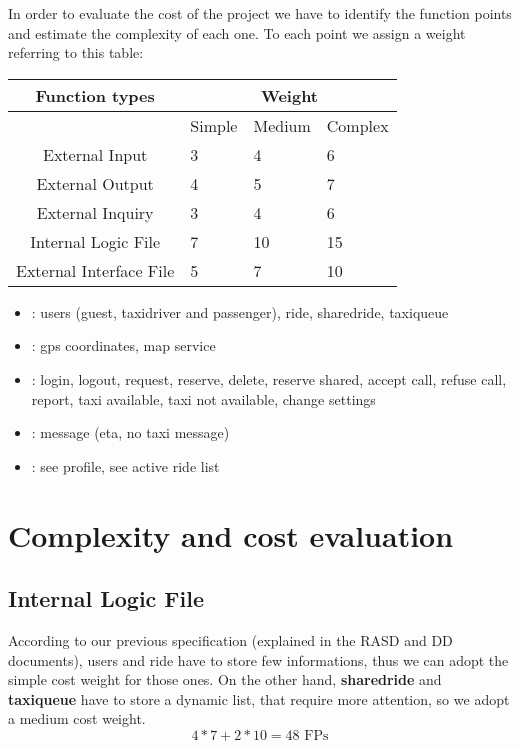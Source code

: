 In order to evaluate the cost of the project we have to identify 
the function points and estimate the complexity of each one.
To each point we assign a weight referring to this table:\\

\begin{tabular}{ | c | l | l | l |}
    \hline
     Function types & \multicolumn{3}{|c|}{Weight} \\\hline
       & Simple  & Medium & Complex \\ \hline
    External Input & 3 & 4 & 6   \\ \hline
    External Output & 4 & 5 & 7 \\ \hline
    External Inquiry & 3 & 4  & 6 \\ \hline
    Internal Logic File & 7 & 10 & 15 \\ \hline
    External Interface File & 5 & 7 & 10  \\ \hline
    \end{tabular}

\begin{itemize}
  \item{: users (guest, taxidriver and passenger), 
                               ride, sharedride, taxiqueue}
  \item{: gps coordinates, map service}
  \item{: login, logout, request, reserve, delete, reserve shared,
                         accept call, refuse call, report, taxi available,
                         taxi not available, change settings}
  \item{: message (eta, no taxi message)}
  \item{: see profile, see active ride list}
\end{itemize}


\section{Complexity and cost evaluation}
  \subsection{Internal Logic File}
  According to our previous specification (explained in the RASD and DD documents),
  users and ride have to store few informations, thus we can adopt the
  simple cost weight for those ones.
  On the other hand, \textbf{sharedride} and \textbf{taxiqueue} have to store a dynamic
  list, that require more attention, so we adopt a medium cost weight.
  \begin{equation}
   4*7 + 2*10 = 48 \text{ FPs}
  \end{equation}

